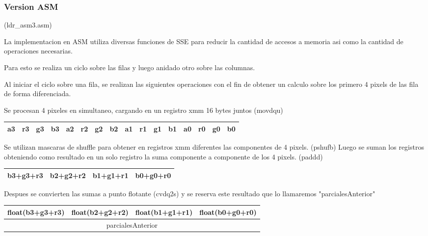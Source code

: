 \newpage
\subsubsection*{Version ASM} (ldr_asm3.asm)

La implementacion en ASM utiliza diversas funciones de SSE para reducir la cantidad de accesos a memoria asi como la cantidad de operaciones necesarias.

Para esto se realiza un ciclo sobre las filas y luego anidado otro sobre las columnas.

Al iniciar el ciclo sobre una fila, se realizan las siguientes operaciones con el fin de obtener un calculo sobre los primero 4 pixels de las fila de forma diferenciada.

Se procesan 4 pixeles en simultaneo, cargando en un registro xmm 16 bytes juntos (movdqu)

\begin{table}[!htbp]
	\centering
	\footnotesize
	\begin{tabular}{| c | c | c | c | c | c | c | c | c | c | c | c | c | c | c | c |}
		\hline
		a3 & r3 & g3 & b3 & a2 & r2 & g2 & b2 & a1 & r1 & g1 & b1 & a0 & r0 & g0 & b0  \\ \hline
	\end{tabular}
\end{table}


Se utilizan mascaras de shuffle para obtener en registros xmm diferentes las componentes de 4 pixels. (pshufb)
Luego se suman los registros obteniendo como resultado en un solo registro la suma componente a componente de los 4 pixels. (paddd)
\begin{table}[!htbp]
	\centering
	\footnotesize
	\begin{tabular}{| c | c | c | c |}
		\hline
		b3+g3+r3 & b2+g2+r2 & b1+g1+r1 & b0+g0+r0 \\ \hline
	\end{tabular}
\end{table}


Despues se convierten las sumas a punto flotante (cvdq2s) y se reserva este resultado que lo llamaremos "parcialesAnterior"
\begin{table}[!htbp]
	\centering
	\footnotesize
	\begin{tabular}{| c | c | c | c |}
		\hline
		float(b3+g3+r3) & float(b2+g2+r2) & float(b1+g1+r1) & float(b0+g0+r0) \\ \hline
		\multicolumn{4}{c}{parcialesAnterior}
	\end{tabular}
\end{table}



